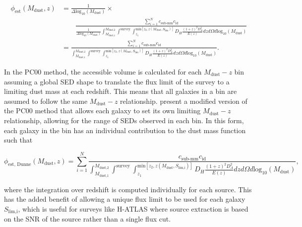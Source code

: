\begin{align}
    \phi_{\textrm{est}}(M_{\textrm{dust}},z) &= \frac{1}{\Delta \textrm{log}_{10}(M_{\textrm{dust}})} \times \nonumber \\
    & \qquad \frac{\sum_{i=1}^N c_{\scriptscriptstyle \textrm{sub-mm}} c_{\scriptscriptstyle \textrm{id}}}{\frac{1}{\Delta \textrm{log}_{10}(M_\textrm{dust})}\int_{\scriptscriptstyle M_{\textrm{dust,1}}}^{\scriptscriptstyle M_{\textrm{dust,2}}} \int^{\scriptscriptstyle \textrm{survey}} \int_{\scriptscriptstyle z_1}^{\scriptscriptstyle \textrm{min}[z_2, z(M_{\textrm{dust}},S_{\textrm{lim}})]} D_H \frac{(1+z)^2 D_A^2}{E(z)} dz d\Omega d\textrm{log}_{10}(M_\textrm{dust})} \nonumber \\
    &= \frac{\sum_{i=1}^N c_{\scriptscriptstyle \textrm{sub-mm}} c_{\scriptscriptstyle \textrm{id}}}{\int_{\scriptscriptstyle M_{\textrm{dust,1}}}^{\scriptscriptstyle M_{\textrm{dust,2}}} \int^{\scriptscriptstyle \textrm{survey}} \int_{\scriptscriptstyle z_1}^{\scriptscriptstyle \textrm{min}[z_2, z(M_{\textrm{dust}},S_{\textrm{lim}})]} D_H \frac{(1+z)^2 D_A^2}{E(z)} dz d\Omega d\textrm{log}_{10}(M_\textrm{dust})}.
\label{eq:phi_pc00_method}
\end{align}

In the PC00 method, the accessible volume is calculated for each $M_{\textrm{dust}} - z$ bin assuming a global SED shape to translate the flux limit of the survey to a limiting dust mass at each redshift. This means that all galaxies in a bin are assumed to follow the same $M_{\textrm{dust}} - z$ relationship. \citealt{Dunne_2011} present a modified version of the PC00 method that allows each galaxy to set its own limiting $M_{\textrm{dust}} - z$ relationship, allowing for the range of SEDs observed in each bin. In this form, each galaxy in the bin has an individual contribution to the dust mass function such that

\begin{equation}
    \phi_{\textrm{est, Dunne}}(M_{\textrm{dust}},z) = \sum_{i=1}^N \frac{c_{\scriptscriptstyle \textrm{sub-mm}} c_{\scriptscriptstyle \textrm{id}}}{\int_{\scriptscriptstyle M_{\textrm{dust,1}}}^{\scriptscriptstyle M_{\textrm{dust,2}}} \int^{\scriptscriptstyle \textrm{survey}} \int_{\scriptscriptstyle z_1}^{\scriptscriptstyle \textrm{min}[z_2, z(M_{\textrm{dust}},S_{\textrm{lim,i}})]} D_H \frac{(1+z)^2 D_A^2}{E(z)} dz d\Omega d\textrm{log}_{10}(M_\textrm{dust})},
\label{eq:phi_pc00_dunne_method}
\end{equation}

\noindent where the integration over redshift is computed individually for each source. This has the added benefit of allowing a unique flux limit to be used for each galaxy $S_{\textrm{lim,i}}$, which is useful for surveys like H-ATLAS where source extraction is based on the SNR of the source rather than a single flux cut.

